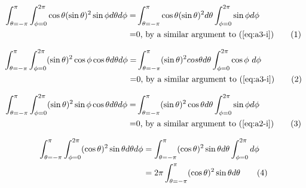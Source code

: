 \documentclass[]{article}
\newcommand\numberthis{\addtocounter{equation}{1}\tag{\theequation}}
\begin{document}
\begin{align*}
\int_{\theta=-\pi}^{\pi}\int_{\phi=0}^{2\pi}\cos\theta(\sin\theta)^2\sin\phi  d\theta d\phi=&\int_{\theta=-\pi}^{\pi}\cos\theta(\sin\theta)^2d\theta\int_{\phi=0}^{2\pi}\sin\phi   d\phi\\=&0 \text{, by a similar argument to (\ref{eq:a3-i})} \numberthis \label{eq:a3-j}
\end{align*}

\begin{align*}
\int_{\theta=-\pi}^{\pi}\int_{\phi=0}^{2\pi}(\sin\theta)^2\cos\phi\cos\theta d\theta d\phi=&
\int_{\theta=-\pi}^{\pi}  (\sin\theta)^2 cos\theta d\theta \int_{\phi=0}^{2\pi}\cos\phi\ d\phi\\
=&0 \text{, by a similar argument to (\ref{eq:a3-i})} \numberthis \label{eq:a1-k}
\end{align*}

\begin{align*}
\int_{\theta=-\pi}^{\pi}\int_{\phi=0}^{2\pi}(\sin\theta)^2\sin\phi\cos\theta d\theta d\phi=&
\int_{\theta=-\pi}^{\pi} (\sin\theta)^2 \cos\theta d\theta \int_{\phi=0}^{2\pi}\sin\phi d\phi\\=&0 \text{, by a similar argument to (\ref{eq:a2-i})} \numberthis \label{eq:a2-k}
\end{align*}

\begin{align*}
\int_{\theta=-\pi}^{\pi} \int_{\phi=0}^{2\pi} (\cos\theta)^2\sin\theta d\theta   d\phi &= \int_{\theta=-\pi}^{\pi} (\cos\theta)^2\sin\theta d\theta  \int_{\phi=0}^{2\pi} d\phi \\ &= 2 \pi \int_{\theta=-\pi}^{\pi} (\cos\theta)^2\sin\theta d\theta   \numberthis \label{eq:a3-k}
\end{align*}
\end{document}
